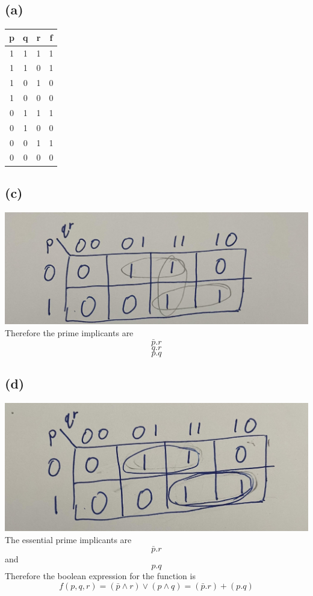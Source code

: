 \documentclass[12pt]{article}
\begin{document}
\subsection*{(a)}
\begin{center}
    \begin{tabular}{ |c|c|c||c| }
        p & q & r  & f\\
        \hline
        1 & 1 & 1 & 1\\
        \hline
        1 & 1 & 0 & 1\\
        \hline
        1 & 0 & 1 & 0\\
        \hline
        1 & 0 & 0 & 0\\
        \hline
        0 & 1 & 1 & 1\\
        \hline
        0 & 1 & 0 & 0\\
        \hline
        0 & 0 & 1 & 1\\
        \hline
        0 & 0 & 0 & 0\\
        \hline

    \end{tabular}
\end{center}
\subsection*{(c)}
\includegraphics[scale=0.1]{KmapPrime.jpg}\\
Therefore the prime implicants are 
$$\boxed{\bar{p}.r}$$
$$\boxed{q.r}$$
$$\boxed{p.q}$$
\subsection*{(d)}
\includegraphics[scale=0.1]{KmapFinal.jpg}\\
The essential prime implicants are
$$\bar{p}.r$$
and 
$$p.q$$
Therefore the boolean expression for the function is 
$$f(p,q,r)=\boxed{(\bar{p}\wedge r)\vee(p\wedge q)=(\bar{p}.r)+(p.q)}$$
\end{document}
